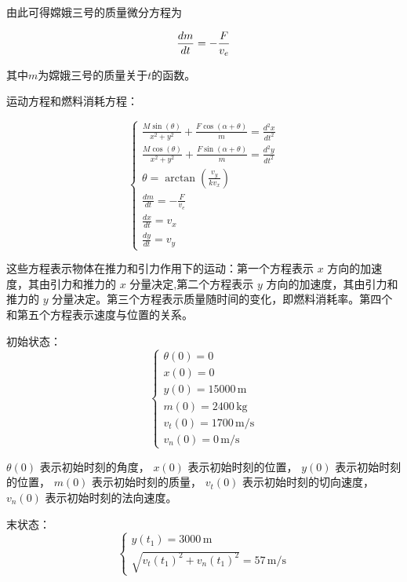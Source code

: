\documentclass{ctexart}
\begin{document}
由此可得嫦娥三号的质量微分方程为

\begin{equation}
\frac{dm}{dt} = -\frac{F}{v_e} \\
\end{equation}

其中\(m\)为嫦娥三号的质量关于\(t\)的函数。

运动方程和燃料消耗方程：

\begin{equation}
\begin{cases}
\displaystyle \frac{M \sin(\theta)}{x^2 + y^2} + \frac{F \cos(\alpha + \theta)}{m} = \frac{d^2 x}{dt^2} \\
\displaystyle \frac{M \cos(\theta)}{x^2 + y^2} + \frac{F \sin(\alpha + \theta)}{m} = \frac{d^2 y}{dt^2} \\
\displaystyle \theta = \arctan\left( \frac{v_y}{k v_x} \right) \\
\displaystyle \frac{dm}{dt} = -\frac{F}{v_e} \\
\displaystyle \frac{dx}{dt} = v_x \\
\displaystyle \frac{dy}{dt} = v_y
\end{cases}
\end{equation}

这些方程表示物体在推力和引力作用下的运动：第一个方程表示 $x$ 方向的加速度，其由引力和推力的 $x$ 分量决定,第二个方程表示 $y$ 方向的加速度，其由引力和推力的 $y$ 分量决定。第三个方程表示质量随时间的变化，即燃料消耗率。第四个和第五个方程表示速度与位置的关系。


初始状态：
\begin{equation}
\begin{cases}
\theta(0) = 0 \\
x(0) = 0 \\
y(0) = 15000 \, \text{m} \\
m(0) = 2400 \, \text{kg} \\
v_t(0) = 1700 \, \text{m/s} \\
v_n(0) = 0 \, \text{m/s}
\end{cases}
\end{equation}


$\theta(0)$ 表示初始时刻的角度，
$x(0)$ 表示初始时刻的位置，
$y(0)$ 表示初始时刻的位置，
$m(0)$ 表示初始时刻的质量，
$v_t(0)$ 表示初始时刻的切向速度，
$v_n(0)$ 表示初始时刻的法向速度。

末状态：
\begin{equation}
\begin{cases}
y(t_1) = 3000 \, \text{m} \\
\sqrt{v_t(t_1)^2 + v_n(t_1)^2} = 57 \, \text{m/s}
\end{cases}
\end{equation}
\end{document}
